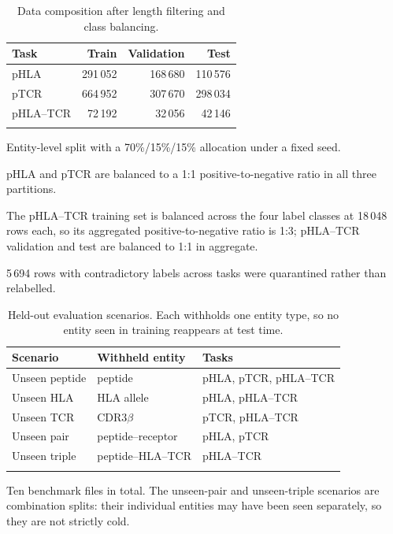 \documentclass[webpdf,modern,large,namedate]{oup-authoring-template}
\theoremstyle{thmstyleone}
\theoremstyle{thmstyletwo}
\theoremstyle{thmstylethree}
\newcommand{\PH}{pHLA}
\newcommand{\PT}{pTCR}
\newcommand{\PHT}{pHLA--TCR}
\begin{document}
\begin{table}[!t]
\caption{Data composition after length filtering and class balancing.%
\label{tab:data}}
\begin{tabular*}{\columnwidth}{@{\extracolsep\fill}lrrr@{\extracolsep\fill}}
\toprule
Task & Train & Validation & Test\\
\midrule
\PH{}  & 291\,052 & 168\,680 & 110\,576\\
\PT{}  & 664\,952 & 307\,670 & 298\,034\\
\PHT{} &  72\,192 &  32\,056 &  42\,146\\
\botrule
\end{tabular*}
\begin{tablenotes}%
\item Entity-level split with a 70\%/15\%/15\% allocation under a fixed seed.
\item \PH{} and \PT{} are balanced to a 1:1 positive-to-negative ratio in all
three partitions.
\item The \PHT{} training set is balanced across the four label classes at
18\,048 rows each, so its aggregated positive-to-negative ratio is 1:3;
\PHT{} validation and test are balanced to 1:1 in aggregate.
\item 5\,694 rows with contradictory labels across tasks were quarantined
rather than relabelled.
\end{tablenotes}
\end{table}

\begin{table}[!t]
\caption{Held-out evaluation scenarios. Each withholds one entity type, so no
entity seen in training reappears at test time.\label{tab:scenarios}}
\begin{tabular*}{\columnwidth}{@{\extracolsep\fill}lll@{\extracolsep\fill}}
\toprule
Scenario & Withheld entity & Tasks\\
\midrule
Unseen peptide & peptide            & \PH{}, \PT{}, \PHT{}\\
Unseen HLA     & HLA allele         & \PH{}, \PHT{}\\
Unseen TCR     & CDR3$\beta$        & \PT{}, \PHT{}\\
Unseen pair    & peptide--receptor  & \PH{}, \PT{}\\
Unseen triple  & peptide--HLA--TCR  & \PHT{}\\
\botrule
\end{tabular*}
\begin{tablenotes}%
\item Ten benchmark files in total. The unseen-pair and unseen-triple
scenarios are combination splits: their individual entities may have been seen
separately, so they are not strictly cold.
\end{tablenotes}
\end{table}
\end{document}
